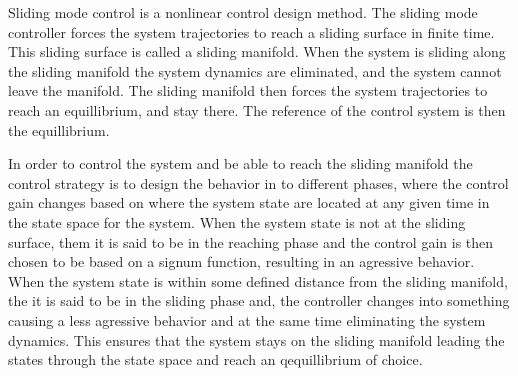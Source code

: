 Sliding mode control is a nonlinear control design method. The sliding mode controller forces the system trajectories to
reach a sliding surface in finite time. This sliding surface is called a sliding manifold. When the system is sliding
along the sliding manifold the system dynamics are eliminated, and the system cannot leave the manifold. The sliding
manifold then forces the system trajectories to reach an equillibrium, and stay there. The reference of the control
system is then the equillibrium. 

In order to control the system and be able to reach the sliding manifold the control strategy is to design the behavior
in to different phases, where the control gain changes based on where the system state are located at any given time in
the state space for the system. When the system state is not at the sliding surface, them it is said to be in the
reaching phase and the control gain is then chosen to be based on a signum function, resulting in an agressive
behavior. When the system state is within some defined distance from the sliding manifold, the it is said to be in the
sliding phase and, the controller changes into something causing a less agressive behavior and at the same time
eliminating the system dynamics. This ensures that the system stays on the sliding manifold leading the states through
the state space and reach an qequillibrium of choice.


